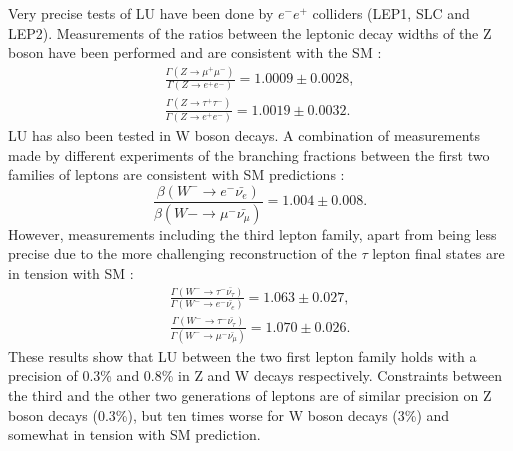 Very precise tests of LU have been done by $e^-e^+$ colliders (LEP1, SLC and LEP2). Measurements of the ratios between the leptonic decay widths of the Z boson have been performed and are consistent with the SM \cite{ALEPH:2005ab}:
\begin{align}
	\frac{\Gamma(Z\to\mu^+\mu^-)}{\Gamma(Z\to e^+e^-)}=1.0009\pm 0.0028,
	\\
	\frac{\Gamma(Z\to\tau^+\tau^-)}{\Gamma(Z\to e^+e^-)}=1.0019\pm 0.0032.
\end{align}
LU has also been tested in W boson decays. A combination of measurements made by different experiments of the branching fractions between the first two families of leptons are consistent with SM predictions \cite{Pich:2013lsa}:
\begin{equation}
\frac{\beta(W^-\to e^-\bar{\nu_e})}{\beta(W-\to \mu^-\bar{\nu_\mu})}=1.004\pm 0.008.
\end{equation}
However, measurements including the third lepton family, apart from being less precise due to the more challenging reconstruction of the $\tau$ lepton final states are in tension with SM \cite{Schael:2013ita}:
\begin{align}
\frac{\Gamma(W^-\to\tau^-\bar{\nu_\tau})}{\Gamma(W^-\to e^-\bar{\nu_e})}=1.063\pm 0.027,
\\
\frac{\Gamma(W^-\to\tau^-\bar{\nu_\tau})}{\Gamma(W^-\to \mu^-\bar{\nu_\mu})}=1.070\pm 0.026.
\end{align}
These results show that LU between the two first lepton family holds with a precision of 0.3\% and 0.8\% in Z and W decays respectively. Constraints between the third and the other two generations of leptons are of similar precision on Z boson decays (0.3\%), but ten times worse for W boson decays (3\%) and somewhat in tension with SM prediction. %


